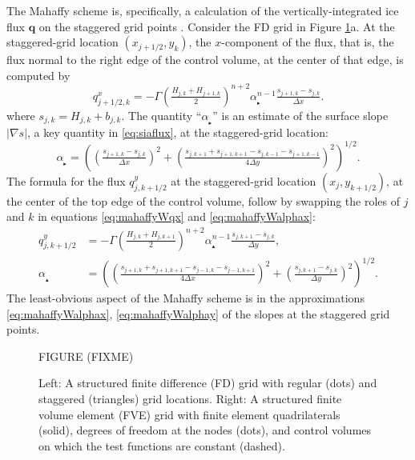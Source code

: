 \documentclass[11pt]{amsart}
\newcommand\bq{\mathbf{q}}
\newcommand{\grad}{\nabla}
\newcommand\alpharight{\alpha_{{}_{\blacktriangleright}}}
\newcommand\alphaup{\alpha_{{\!}_{\blacktriangle}}}
\begin{document}
The Mahaffy scheme is, specifically, a calculation of the vertically-integrated ice flux $\bq$ on the staggered grid points \cite[equations (19), (20)]{Mahaffy1976}.  Consider the FD grid in Figure \ref{fig:fdfemgrids}a.  At the staggered-grid location $(x_{j+1/2},y_k)$, the $x$-component of the flux, that is, the flux normal to the right edge of the control volume, at the center of that edge, is computed by
\begin{equation}
q^x_{j+1/2,k} = - \Gamma \left(\tfrac{H_{j,k} + H_{j+1,k}}{2}\right)^{n+2} \alpharight^{n-1} \tfrac{s_{j+1,k} - s_{j,k}}{\Delta x}.  \label{eq:mahaffyWqx}
\end{equation}
where $s_{j,k} = H_{j,k} + b_{j,k}$.  The quantity ``$\alpharight$'' is an estimate of the surface slope $|\grad s|$, a key quantity in \eqref{eq:siaflux}, at the staggered-grid location:
\begin{equation}
\alpharight = \left(\left(\tfrac{s_{j+1,k} - s_{j,k}}{\Delta x}\right)^2 + \left(\tfrac{s_{j,k+1} + s_{j+1,k+1} - s_{j,k-1} - s_{j+1,k-1}}{4 \Delta y}\right)^2\right)^{1/2}.  \label{eq:mahaffyWalphax}
\end{equation}
The formula for the flux $q^y_{j,k+1/2}$ at the staggered-grid location $(x_j,y_{k+1/2})$, at the center of the top edge of the control volume, follow by swapping the roles of $j$ and $k$ in equations \eqref{eq:mahaffyWqx} and \eqref{eq:mahaffyWalphax}:
\begin{align}
q^y_{j,k+1/2} &= - \Gamma \left(\tfrac{H_{j,k} + H_{j,k+1}}{2}\right)^{n+2} \alphaup^{n-1} \tfrac{s_{j,k+1} - s_{j,k}}{\Delta y}, \label{eq:mahaffyWqy} \\
\alphaup &= \left(\left(\tfrac{s_{j+1,k} + s_{j+1,k+1} - s_{j-1,k} - s_{j-1,k+1}}{4 \Delta x}\right)^2 + \left(\tfrac{s_{j,k+1} - s_{j,k}}{\Delta y}\right)^2\right)^{1/2}.  \label{eq:mahaffyWalphay}
\end{align}
The least-obvious aspect of the Mahaffy scheme is in the approximations \eqref{eq:mahaffyWalphax}, \eqref{eq:mahaffyWalphay} of the slopes at the staggered grid points.

\begin{figure}[ht]
\begin{center}
FIGURE (FIXME)
\end{center}
\caption{Left: A structured finite difference (FD) grid with regular (dots) and staggered (triangles) grid locations.  Right: A structured finite volume element (FVE) grid with finite element quadrilaterals (solid), degrees of freedom at the nodes (dots), and control volumes on which the test functions are constant (dashed).}
\label{fig:fdfemgrids}
\end{figure}
\end{document}
